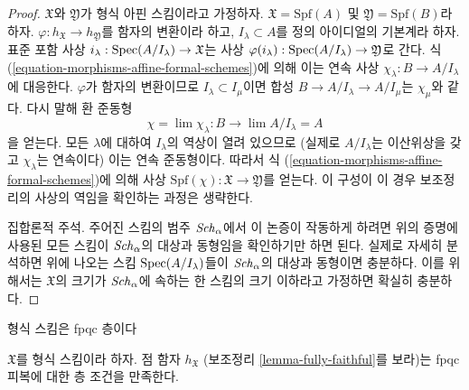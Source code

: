 \begin{proof}
\medskip\noindent
$\mathfrak X$와 $\mathfrak Y$가 형식 아핀 스킴이라고 가정하자.
$\mathfrak X = \text{Spf}(A)$ 및 $\mathfrak Y = \text{Spf}(B)$라 하자.
$\varphi : h_\mathfrak X \to h_\mathfrak Y$를 함자의 변환이라 하고,
$I_\lambda \subset A$를 정의 아이디얼의 기본계라 하자. 표준 포함 사상
$i_\lambda : \mathop{\mathrm{Spec}}(A/I_\lambda) \to \mathfrak X$는 사상
$\varphi(i_\lambda) : \mathop{\mathrm{Spec}}(A/I_\lambda) \to \mathfrak Y$로 간다.
식 (\ref{equation-morphisms-affine-formal-schemes})에 의해 이는 연속 사상
$\chi_\lambda : B \to A/I_\lambda$에 대응한다.
$\varphi$가 함자의 변환이므로 $I_\lambda \subset I_\mu$이면 합성
$B \to A/I_\lambda \to A/I_\mu$는 $\chi_\mu$와 같다.
다시 말해 환 준동형
$$
\chi = \lim \chi_\lambda : B \longrightarrow \lim A/I_\lambda = A
$$
을 얻는다. 모든 $\lambda$에 대하여 $I_\lambda$의 역상이 열려 있으므로
(실제로 $A/I_\lambda$는 이산위상을 갖고 $\chi_\lambda$는 연속이다)
이는 연속 준동형이다. 따라서 식
(\ref{equation-morphisms-affine-formal-schemes})에 의해 사상
$\text{Spf}(\chi) : \mathfrak X \to \mathfrak Y$를 얻는다.
이 구성이 이 경우 보조정리의 사상의 역임을 확인하는 과정은 생략한다.

\medskip\noindent
집합론적 주석. 주어진 스킴의 범주 $\mathit{Sch}_\alpha$에서 이 논증이
작동하게 하려면 위의 증명에 사용된 모든 스킴이 $\mathit{Sch}_\alpha$의
대상과 동형임을 확인하기만 하면 된다. 실제로 자세히 분석하면 위에
나오는 스킴 $\mathop{\mathrm{Spec}}(A/I_\lambda)$들이 $\mathit{Sch}_\alpha$의 대상과
동형이면 충분하다. 이를 위해서는 $\mathfrak X$의 크기가
$\mathit{Sch}_\alpha$에 속하는 한 스킴의 크기 이하라고 가정하면 확실히
충분하다.
\end{proof}


\begin{lemma}
\label{lemma-formal-scheme-sheaf-fppf}
\begin{slogan}
형식 스킴은 fpqc 층이다
\end{slogan}
$\mathfrak X$를 형식 스킴이라 하자. 점 함자 $h_\mathfrak X$
(보조정리 \ref{lemma-fully-faithful}를 보라)는 fpqc 피복에 대한
층 조건을 만족한다.
\end{lemma}

